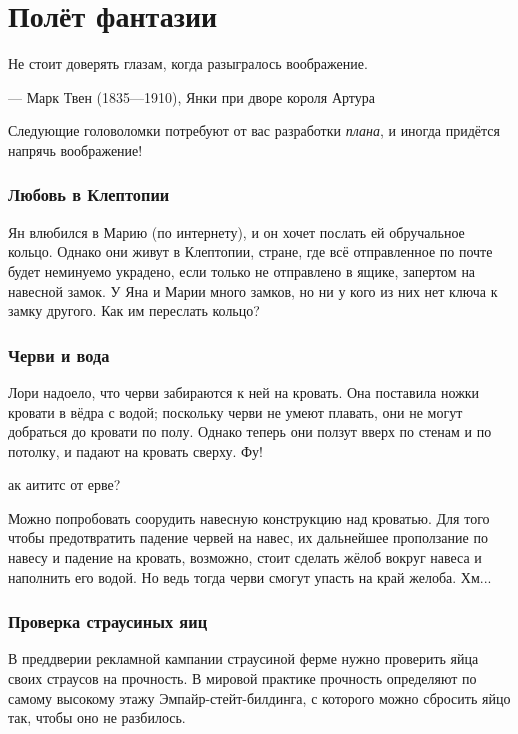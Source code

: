 \chapter{Полёт фантазии}


\setlength{\epigraphwidth}{.80\textwidth}
\epigraph{Не стоит доверять глазам, когда разыгралось воображение.
}{--- Марк Твен (1835---1910), Янки при дворе короля Артура}

Следующие головоломки потребуют от вас разработки \emph{плана},
и иногда придётся напрячь воображение!

\subsection*{Любовь в Клептопии}\label{Любовь в Клептопии}

Ян влюбился в Марию (по интернету), и он хочет послать ей обручальное кольцо.
Однако они живут в Клептопии, стране, где всё отправленное по почте будет неминуемо украдено, если только не отправлено в ящике, запертом на навесной замок.
У Яна и Марии много замков, но ни у кого из них нет ключа к замку другого.
Как им переслать кольцо?

\subsection*{Черви и вода}\label{Черви и вода}

Лори надоело, что черви забираются к ней на кровать.
Она поставила ножки кровати в вёдра с водой;
поскольку черви не умеют плавать, они не могут добраться до кровати по полу.
Однако теперь они ползут вверх по стенам и по потолку, и падают на кровать сверху.
Фу!

ак аититс от ерве?

Можно попробовать соорудить навесную конструкцию над кроватью.
Для того чтобы предотвратить падение червей на навес,
их дальнейшее проползание по навесу
и падение на кровать, возможно, стоит сделать жёлоб вокруг навеса и наполнить его водой.
Но ведь тогда черви смогут упасть на край желоба.
Хм...

\subsection*{Проверка страусиных яиц}

В преддверии рекламной кампании страусиной ферме нужно проверить яйца своих страусов на прочность.
В мировой практике прочность определяют по самому высокому этажу Эмпайр-стейт-билдинга, с которого можно сбросить яйцо так, чтобы оно не разбилось.

